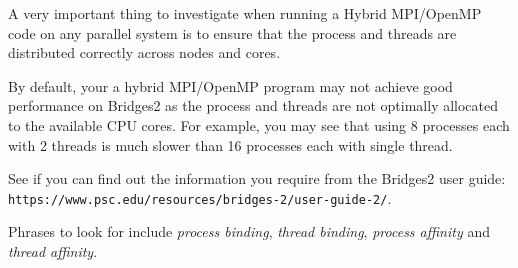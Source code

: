 \documentclass{article}
\begin{document}
A very important thing to investigate when running a Hybrid MPI/OpenMP
code on any parallel system is to ensure that
the process and threads are distributed correctly across nodes and
cores.

By default, your a hybrid MPI/OpenMP program may not achieve good
performance on Bridges2 as the process and threads are not optimally
allocated to the available CPU cores. For example, you may see that
using 8 processes each with 2 threads is much slower than 16
processes each with single thread.

See if you can find out the information you require from the Bridges2
user guide: \\
\verb+https://www.psc.edu/resources/bridges-2/user-guide-2/+.

Phrases to look for include {\em process binding}, {\em thread
  binding}, {\em process affinity} and {\em thread affinity}.
\end{document}
